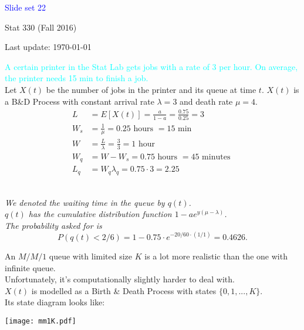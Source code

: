 \documentclass[20pt,landscape]{foils}
\newcommand{\no}{\noindent}
\begin{document}
\LogoOff


\foilhead[1.3in]{}
\centerline{\LARGE \textcolor{blue}{Slide set 22}}
\vspace{0.3in}
\centerline{\large Stat 330 (Fall 2016)}
\vspace{0.2in}
\centerline{\tiny Last update: \today}
\setcounter{page}{0}

\foilhead[-.8in]{\textcolor{blue}{The $M/M/1$ Queue: Example}}\vspace{0.3cm}
\no {\textcolor{magenta}{Printer Queue (continued)}} {\textcolor{cyan}{A certain printer in the Stat Lab gets jobs with a rate of 3 per hour. On average, the printer needs 15 min to finish a job.}}\\[.1in]
\no Let $X(t)$ be the number of jobs in the printer and its queue at time $t$. $X(t)$ is a B\&D Process with constant arrival rate $\lambda = 3$ and death rate $\mu = 4$.\\[.1in] 
{\small
  \begin{align*}
L &= E[X(t)] = \frac{a}{1-a} = \frac{0.75}{0.25} = 3 \\
W_s &= \frac{1}{\mu} = 0.25 \text{ hours } = 15 \text{ min } \\
W &= \frac{L}{\lambda} = \frac{3}{3} = 1 \text{ hour} \\
W_q &= W - W_s = 0.75 \text{ hours } = 45 \text{ minutes } \\
L_q &= W_q \lambda_q = 0.75 \cdot 3 = 2.25
\end{align*}}

\foilhead[-.8in]{\textcolor{blue}{The $M/M/1$ Queue: Example (cont'd)}}\vspace*{3mm}
\no {\textcolor{cyan}{On average, a job has to spend 45 min in the queue. What is the probability that a job has to spend less than 20 min in the queue?}}\\[.3in]
{\it 
\no We denoted the waiting time in the queue by $q(t)$. \\[.2in]
\no $q(t)$ has the cumulative distribution function $1 - a e^{y (\mu - \lambda)}$.\\[.2in]
\no The probability asked for is 
\[
P(q(t) < 2/6) = 1 - 0.75 \cdot e^{-20/60 \cdot (1/1)} = 0.4626.
\]
}

\foilhead[-.8in]{\textcolor{blue}{The $M/M/1/K$ queue}}\vspace*{.2in}
\no  An $M/M/1$ queue with limited size $K$ is a lot more realistic than the one with infinite queue. \\[.1in]
\no Unfortunately, it's computationally slightly harder to deal with.\\[.1in]
\no $X(t)$ is modelled as a Birth \& Death Process with states $\{0, 1, ..., K \}$.\\[.1in]
\no Its state diagram looks like:\\[.1in]
\centerline {\texttt{[image: mm1K.pdf]}}
\end{document}
